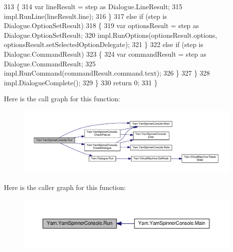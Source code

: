 \begin{DoxyCode}
313                     \{
314                         var lineResult = step as Dialogue.LineResult;
315                         impl.RunLine(lineResult.line);
316                     \}
317                     \textcolor{keywordflow}{else} \textcolor{keywordflow}{if} (step is Dialogue.OptionSetResult)
318                     \{
319                         var optionsResult = step as Dialogue.OptionSetResult;
320                         impl.RunOptions(optionsResult.options, optionsResult.setSelectedOptionDelegate);
321                     \}
322                     \textcolor{keywordflow}{else} \textcolor{keywordflow}{if} (step is Dialogue.CommandResult)
323                     \{
324                         var commandResult = step as Dialogue.CommandResult;
325                         impl.RunCommand(commandResult.command.text);
326                     \}
327                 \}
328                 impl.DialogueComplete();
329             \}
330             \textcolor{keywordflow}{return} 0;
331         \}
\end{DoxyCode}


Here is the call graph for this function\-:
\nopagebreak
\begin{figure}[H]
\begin{center}
\leavevmode
\includegraphics[width=350pt]{a00172_a1b974c55540795a9e643c2ec055fbd51_cgraph}
\end{center}
\end{figure}




Here is the caller graph for this function\-:
\nopagebreak
\begin{figure}[H]
\begin{center}
\leavevmode
\includegraphics[width=350pt]{a00172_a1b974c55540795a9e643c2ec055fbd51_icgraph}
\end{center}
\end{figure}


